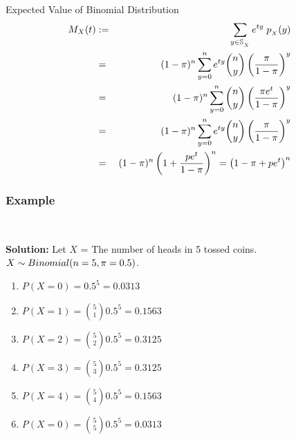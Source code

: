 \documentclass[compress]{beamer}
\begin{document}
\begin{frame}{Expected Value of Binomial Distribution}
\begin{eqnarray}
M_X(t)& := &  \sum_{y\in \support[X]} e^{ty}\; \pmf_{_X}(y) \nonumber\\
& =& (1-\binP)^{n}  \sum_{y=0}^{n}  e^{ty} {n\choose y}\left( \frac{\binP}{1-\binP}\right)^y   \nonumber\\
& =& (1-\binP)^{n}  \sum_{y=0}^{n}  {n\choose y}\left( \frac{\binP e^{t}}{1-\binP}\right)^y   \nonumber\\
& =& (1-\binP)^{n}  \sum_{y=0}^{n}  e^{ty} {n\choose y}\left( \frac{\binP}{1-\binP}\right)^y   \nonumber\\
& =& (1-\binP)^{n} \left( 1+  \frac{pe^t}{1-\binP} \right)^n = \left( 1-\binP+pe^t\right)^n  \nonumber\\
\end{eqnarray}



\end{frame}






\begin{frame}\frametitle{Example}
\vspace{-.1in}
\\
\pause
\vspace{.1in}
{\tiny 
{\bf Solution: }
Let $X$ = The number of heads in 5 tossed coins. $X\sim Binomial(n=5, \pi=0.5)$.
\begin{enumerate}
\item $P(X = 0) =0.5^5 = 0.0313$
\item $P(X = 1) ={5 \choose 1}0.5^5 =0.1563$
\item $P(X = 2) ={5 \choose 2}0.5^5 =0.3125$
\item $P(X = 3) ={5 \choose 3}0.5^5 =0.3125$
\item $P(X = 4) ={5 \choose 4}0.5^5 =0.1563$
\item $P(X = 0) ={5 \choose 5}0.5^5 = 0.0313$
\end{enumerate}
}
\end{frame}
\end{document}

